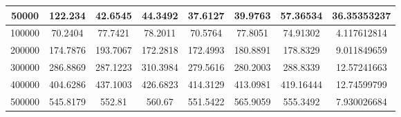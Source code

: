 \documentclass{article}
\begin{document}
\begin{table}[]
\begin{tabular}{|c|c|c|c|c|c|c|c| }
            50000   & 122.234	&   42.6545 &	44.3492  &  37.6127  & 39.9763 & 57.36534 & 36.35353237 \\ \hline
            100000  & 70.2404	&   77.7421 &	78.2011  &  70.5764  & 77.8051 & 74.91302 & 4.117612814 \\ \hline
            200000   & 174.7876&	193.7067&	172.2818 &	172.4993 & 180.8891& 178.8329 & 9.011849659 \\ \hline
            300000   & 286.8869&	287.1223&	310.3984 &	279.5616 & 280.2003& 288.8339 & 12.57241663 \\ \hline
            400000   & 404.6286&	437.1003&	426.6823 &	414.3129 & 413.0981& 419.16444& 12.74599799 \\ \hline
            500000   & 545.8179&	552.81  &	560.67   &	551.5422 & 565.9059& 555.3492 & 7.930026684 \\ \hline
            \end{tabular}
    \end{table}
\end{document}
